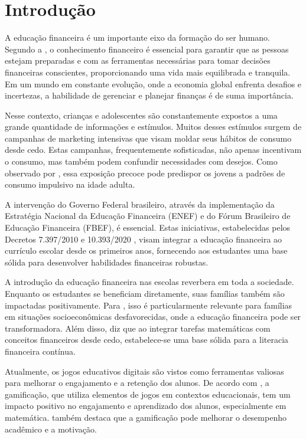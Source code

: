 \chapter{Introdução}

A educação financeira é um importante eixo da formação do ser humano. Segundo a , o conhecimento financeiro é essencial para garantir que as pessoas estejam preparadas e com as ferramentas necessárias para tomar decisões financeiras conscientes, proporcionando uma vida mais equilibrada e tranquila. Em um mundo em constante evolução, onde a economia global enfrenta desafios e incertezas, a habilidade de gerenciar e planejar finanças é de suma importância.

Nesse contexto, crianças e adolescentes são constantemente expostos a uma grande quantidade de informações e estímulos. Muitos desses estímulos surgem de campanhas de marketing intensivas que visam moldar seus hábitos de consumo desde cedo. Estas campanhas, frequentemente sofisticadas, não apenas incentivam o consumo, mas também podem confundir necessidades com desejos. Como observado por , essa exposição precoce pode predispor os jovens a padrões de consumo impulsivo na idade adulta.

A intervenção do Governo Federal brasileiro, através da implementação da Estratégia Nacional da Educação Financeira (ENEF) e do Fórum Brasileiro de Educação Financeira (FBEF), é essencial. Estas iniciativas, estabelecidas pelos Decretos 7.397/2010 e 10.393/2020 \cite{decreto_10939}, visam integrar a educação financeira ao currículo escolar desde os primeiros anos, fornecendo aos estudantes uma base sólida para desenvolver habilidades financeiras robustas.

A introdução da educação financeira nas escolas reverbera em toda a sociedade. Enquanto os estudantes se beneficiam diretamente, suas famílias também são impactadas positivamente. Para \cite{Frisancho2023Spillover}, isso é particularmente relevante para famílias em situações socioeconômicas desfavorecidas, onde a educação financeira pode ser transformadora. Além disso, \cite{Ozkale2023Designing} diz que ao integrar tarefas matemáticas com conceitos financeiros desde cedo, estabelece-se uma base sólida para a literacia financeira contínua.

Atualmente, os jogos educativos digitais são vistos como ferramentas valiosas para melhorar o engajamento e a retenção dos alunos. De acordo com \cite{lee2023}, a gamificação, que utiliza elementos de jogos em contextos educacionais, tem um impacto positivo no engajamento e aprendizado dos alunos, especialmente em matemática. \cite{dahalan2023} também destaca que a gamificação pode melhorar o desempenho acadêmico e a motivação.

